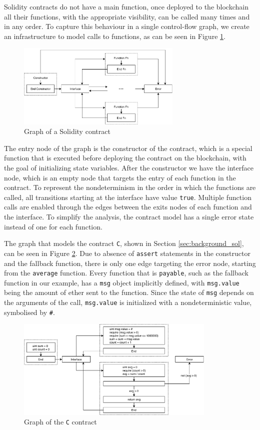 Solidity contracts do not have a main function, once deployed to the blockchain all their functions, with the appropriate visibility, can be called many times and in any order. To capture this behaviour in a single control-flow graph, we create an infrastructure to model calls to functions, as can be seen in Figure \ref{fig:cfg_contract-general}.

\begin{figure}[ht]
	\centering
	\includegraphics[width=0.7\textwidth]{images/contract-general}
	\caption{Graph of a Solidity contract}
	\label{fig:cfg_contract-general}
\end{figure}

The entry node of the graph is the constructor of the contract, which is a special function that is executed before deploying the contract on the blockchain, with the goal of initializing state variables. After the constructor we have the interface node, which is an empty node that targets the entry of each function in the contract. To represent the nondeterminism in the order in which the functions are called, all transitions starting at the interface have value \texttt{true}. Multiple function calls are enabled through the edges between the exits nodes of each function and the interface. To simplify the analysis, the contract model has a single error state instead of one for each function. 

The graph that models the contract \texttt{C}, shown in Section \ref{sec:background_sol}, can be seen in Figure \ref{fig:cfg_contract-c}. Due to absence of \texttt{assert} statements in the constructor and the fallback function, there is only one edge targeting the error node, starting from the \texttt{average} function. Every function that is \texttt{payable}, such as the fallback function in our example, has a \texttt{msg} object implicitly defined, with \texttt{msg.value} being the amount of ether sent to the function. Since the state of \texttt{msg} depends on the arguments of the call, \texttt{msg.value} is initialized with a nondeterministic value, symbolised by \texttt{\#}.

\begin{figure}[ht]
	\centering
	\includegraphics[width=0.85\textwidth]{images/contract-c}
	\caption{Graph of the \texttt{C} contract}
	\label{fig:cfg_contract-c}
\end{figure}
